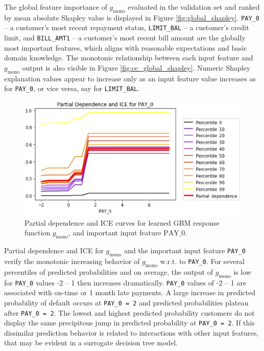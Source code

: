 \documentclass[11pt]{asaproc}
\begin{document}
The global feature importance of $g_{\text{mono}}$ evaluated in the validation set and ranked by mean absolute Shapley value is displayed in Figure \ref{fig:global_shapley}. \texttt{PAY\_0} -- a customer's most recent repayment status, \texttt{LIMIT\_BAL} -- a customer's credit limit, and \texttt{BILL\_AMT1} -- a customer's most recent bill amount are the globally most important features, which aligns with reasonable expectations and basic domain knowledge. The monotonic relationship between each input feature and $g_{\text{mono}}$ output is also visible in Figure \ref{fig:cc_global_shapley}. Numeric Shapley explanation values appear to increase only as an input feature value increases as for \texttt{PAY\_0}, or vice versa, say for \texttt{LIMIT\_BAL}. 

\begin{figure}[htb]
	\begin{center}
		\includegraphics[scale=0.6]{img/figure_8.eps}
		\caption{Partial dependence and ICE curves for learned GBM response function $g_{\text{mono}}$, and important input feature $\text{PAY\_0}$.}
		\label{fig:cc_pdp_ice}
	\end{center}
\end{figure}

Partial dependence and ICE for $g_{\text{mono}}$ and the important input feature \texttt{PAY\_0} verify the monotonic increasing behavior of $g_{\text{mono}}$ w.r.t. to \texttt{PAY\_0}. For several percentiles of predicted probabilities and on average, the output of $g_{\text{mono}}$ is low for \texttt{PAY\_0} values -2 -- 1 then increases dramatically. \texttt{PAY\_0} values of -2 -- 1 are associated with on-time or 1 month late payments. A large increase in predicted probability of default occurs at \texttt{PAY\_0 = 2} and predicted probabilities plateau after \texttt{PAY\_0 = 2}. The lowest and highest predicted probability customers do not display the same precipitous jump in predicted probability at \texttt{PAY\_0 = 2}. If this dissimilar prediction behavior is related to interactions with other input features, that may be evident in a surrogate decision tree model.
\end{document}
